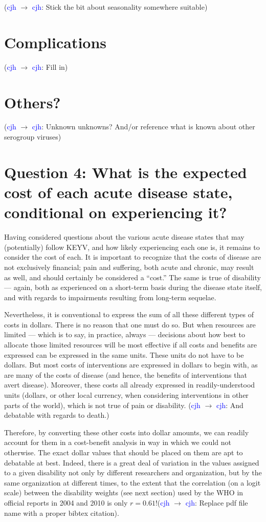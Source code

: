 \documentclass{article}
\newcommand{\cjh}{\textcolor{blue}{cjh}}
\newcommand{\msg}[3]{(#1 $\rightarrow$ #2: #3)}
\newcommand{\mcc}[1]{\msg\cjh\cjh{#1}}
\begin{document}
            \mcc{Stick the bit about seasonality somewhere suitable}

        \section{Complications}
            \mcc{Fill in}

        \section{Others?}
            \mcc{Unknown unknowns? And/or reference what is known about other serogroup viruses}

    \section[Expected costs, given diseases]{Question 4: What is the expected cost of each acute disease state, conditional on experiencing it?}
        Having considered questions about the various acute disease states that may (potentially) follow KEYV, and how likely experiencing each one is, it remains to consider the cost of each. It is important to recognize that the costs of disease are not exclusively financial; pain and suffering, both acute and chronic, may result as well, and should certainly be considered a ``cost.'' The same is true of disability --- again, both as experienced on a short-term basis during the disease state itself, and with regards to impairments resulting from long-term sequelae.

        Nevertheless, it is conventional to express the sum of all these different types of costs in dollars. There is no reason that one must do so. But when resources are limited --- which is to say, in practice, always --- decisions about how best to allocate those limited resources will be most effective if all costs and benefits are expressed can be expressed in the same units. These units do not have to be dollars. But most costs of interventions are expressed in dollars to begin with, as are many of the costs of disease (and hence, the benefits of interventions that avert disease). Moreover, these costs all already expressed in readily-understood units (dollars, or other local currency, when considering interventions in other parts of the world), which is not true of pain or disability. \mcc{And debatable with regards to death.} 
        
        Therefore, by converting these other costs into dollar amounts, we can readily account for them in a cost-benefit analysis in way in which we could not otherwise. The exact dollar values that should be placed on them are apt to debatable at best. Indeed, there is a great deal of variation in the values assigned to a given disability not only by different researchers and organization, but by the same organization at different times, to the extent that the correlation (on a logit scale) between the disability weights (see next section) used by the WHO in official reports in 2004 and 2010 is only $r = 0.61$!\cite{GlobalDALYmethods_2000_2011}\mcc{Replace pdf file name with a proper bibtex citation}.
\end{document}

